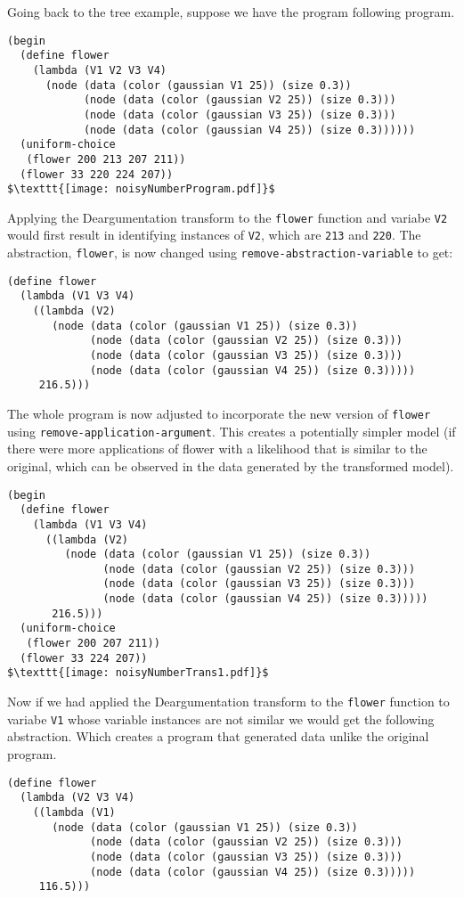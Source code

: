 \documentclass[a4paper,10pt]{article}
\begin{document}
Going back to the tree example, suppose we have the program following program.
\begin{lstlisting}[mathescape=true]
(begin
  (define flower
    (lambda (V1 V2 V3 V4)
      (node (data (color (gaussian V1 25)) (size 0.3))
            (node (data (color (gaussian V2 25)) (size 0.3)))
            (node (data (color (gaussian V3 25)) (size 0.3)))
            (node (data (color (gaussian V4 25)) (size 0.3))))))
  (uniform-choice
   (flower 200 213 207 211))
  (flower 33 220 224 207))
$\texttt{[image: noisyNumberProgram.pdf]}$
\end{lstlisting}
Applying the Deargumentation transform to the \texttt{flower} function and variabe \texttt{V2} would first result in identifying instances of \texttt{V2}, which are \texttt{213} and \texttt{220}.  The abstraction, \texttt{flower}, is now changed using \texttt{remove-abstraction-variable} to get:
\begin{lstlisting}
(define flower
  (lambda (V1 V3 V4)
    ((lambda (V2)
       (node (data (color (gaussian V1 25)) (size 0.3))
             (node (data (color (gaussian V2 25)) (size 0.3)))
             (node (data (color (gaussian V3 25)) (size 0.3)))
             (node (data (color (gaussian V4 25)) (size 0.3)))))
     216.5)))
\end{lstlisting}
The whole program is now adjusted to incorporate the new version of \texttt{flower} using \texttt{remove-application-argument}.  This creates a potentially simpler model (if there were more applications of flower with a likelihood that is similar to the original, which can be observed in the data generated by the transformed model).

\begin{lstlisting}[mathescape=true]
(begin
  (define flower
    (lambda (V1 V3 V4)
      ((lambda (V2)
         (node (data (color (gaussian V1 25)) (size 0.3))
               (node (data (color (gaussian V2 25)) (size 0.3)))
               (node (data (color (gaussian V3 25)) (size 0.3)))
               (node (data (color (gaussian V4 25)) (size 0.3)))))
       216.5)))
  (uniform-choice
   (flower 200 207 211))
  (flower 33 224 207))
$\texttt{[image: noisyNumberTrans1.pdf]}$
\end{lstlisting}
Now if we had applied the Deargumentation transform to the \texttt{flower} function to variabe \texttt{V1} whose variable instances are not similar we would get the following abstraction.  Which creates a program that generated data unlike the original program. 
\begin{lstlisting}
(define flower
  (lambda (V2 V3 V4)
    ((lambda (V1)
       (node (data (color (gaussian V1 25)) (size 0.3))
             (node (data (color (gaussian V2 25)) (size 0.3)))
             (node (data (color (gaussian V3 25)) (size 0.3)))
             (node (data (color (gaussian V4 25)) (size 0.3)))))
     116.5)))
\end{lstlisting}
\end{document}
